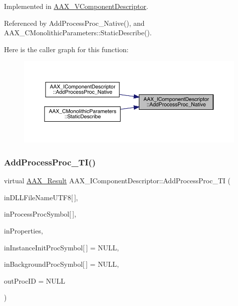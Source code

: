 Implemented in \mbox{\hyperlink{a01901_a21e758a4ad757e694c183548fe58f0f0}{A\+A\+X\+\_\+\+V\+Component\+Descriptor}}.



Referenced by Add\+Process\+Proc\+\_\+\+Native(), and A\+A\+X\+\_\+\+C\+Monolithic\+Parameters\+::\+Static\+Describe().

Here is the caller graph for this function\+:
\nopagebreak
\begin{figure}[H]
\begin{center}
\leavevmode
\includegraphics[width=350pt]{a01781_a1c069508cf54a523905c8160ebf628ad_icgraph}
\end{center}
\end{figure}
\mbox{\label{a01781_a38f7fb30a378a17ce9635f5c36100a3b}} 
\subsubsection{\texorpdfstring{AddProcessProc\_TI()}{AddProcessProc\_TI()}}
{\footnotesize\ttfamily virtual \mbox{\hyperlink{a00392_a4d8f69a697df7f70c3a8e9b8ee130d2f}{A\+A\+X\+\_\+\+Result}} A\+A\+X\+\_\+\+I\+Component\+Descriptor\+::\+Add\+Process\+Proc\+\_\+\+TI (\begin{DoxyParamCaption}\item[{const char}]{in\+D\+L\+L\+File\+Name\+U\+T\+F8\mbox{[}$\,$\mbox{]},  }\item[{const char}]{in\+Process\+Proc\+Symbol\mbox{[}$\,$\mbox{]},  }\item[{\mbox{\hyperlink{a01869}{A\+A\+X\+\_\+\+I\+Property\+Map}} $\ast$}]{in\+Properties,  }\item[{const char}]{in\+Instance\+Init\+Proc\+Symbol\mbox{[}$\,$\mbox{]} = {\ttfamily NULL},  }\item[{const char}]{in\+Background\+Proc\+Symbol\mbox{[}$\,$\mbox{]} = {\ttfamily NULL},  }\item[{\mbox{\hyperlink{a00392_aeaf9b387f902c50a8360ff423f4a1f23}{A\+A\+X\+\_\+\+C\+Selector}} $\ast$}]{out\+Proc\+ID = {\ttfamily NULL} }\end{DoxyParamCaption})\hspace{0.3cm}{\ttfamily [pure virtual]}}



